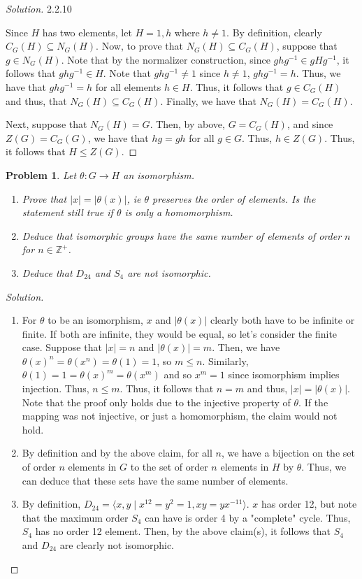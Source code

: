 \documentclass[11 pt]{article}
\newtheorem{Prob}{Problem}
\theoremstyle{definition}
\theoremstyle{remark}
\newenvironment{solution}
  {\renewcommand\qedsymbol{$\blacksquare$}\begin{proof}[Solution]}
  {\end{proof}}
\begin{document}
\begin{solution}
2.2.10

Since $H$ has two elements, let $H={1,h}$ where $h \neq 1$. By definition, clearly $C_G(H) \subseteq N_G(H)$. Now, to prove that $N_G(H) \subseteq C_G(H)$, suppose that $g \in N_G(H)$. Note that by the normalizer construction, since $ghg^{-1} \in gHg^{-1}$, it follows that $ghg^{-1} \in H$. Note that $ghg^{-1} \neq 1$ since $h \neq 1$, $ghg^{-1} = h$. Thus, we have that $ghg^{-1} = h$ for all elements $h \in H$. Thus, it follows that $g \in C_G(H)$ and thus, that $N_G(H) \subseteq C_G(H)$. Finally, we have that $N_G(H) = C_G(H)$.

Next, suppose that $N_G(H) = G$. Then, by above, $G = C_G(H)$, and since $Z(G) = C_G(G)$, we have that $hg=gh$ for all $g \in G$. Thus, $h \in Z(G)$. Thus, it follows that $H \leq Z(G)$.
\end{solution}


\begin{Prob}
	Let $\theta: G\rightarrow H$ an isomorphism.
\begin{enumerate}
	\item Prove that $|x|=|\theta(x)|$, ie $\theta$ preserves the order of elements. Is the statement still true if $\theta$ is only a homomorphism.
	\item Deduce that isomorphic groups have the same number of elements of order $n$ for $n\in\mathbb{Z}^+$.
	\item Deduce that $D_{24}$ and $S_4$ are not isomorphic.
\end{enumerate}
\end{Prob}

\begin{solution}
\begin{enumerate}
    \item For $\theta$ to be an isomorphism, $x$ and $|\theta(x)|$ clearly both have to be infinite or finite. If both are infinite, they would be equal, so let's consider the finite case. Suppose that $|x| = n$ and $|\theta(x)| = m$. Then, we have $\theta(x)^n = \theta(x^n) = \theta(1) = 1$, so $m \leq n$. Similarly, $\theta(1) = 1 = \theta(x)^m = \theta(x^m)$ and so $x^m = 1$ since isomorphism implies injection. Thus, $n \leq m$. Thus, it follows that $n=m$ and thus, $|x| = |\theta(x)|$. Note that the proof only holds due to the injective property of $\theta$. If the mapping was not injective, or just a homomorphism, the claim would not hold.
    
    \item By definition and by the above claim, for all $n$, we have a bijection on the set of order $n$ elements in $G$ to the set of order $n$ elements in $H$ by $\theta$. Thus, we can deduce that these sets have the same number of elements.
    
    \item By definition, $D_{24} = \langle x,y \mid x^{12} = y^2=1, xy=yx^{-11} \rangle$. $x$ has order 12, but note that the maximum order $S_4$ can have is order 4 by a "complete" cycle. Thus, $S_4$ has no order 12 element. Then, by the above claim(s), it follows that $S_4$ and $D_{24}$ are clearly not isomorphic.
\end{enumerate}
\end{solution}
\end{document}

